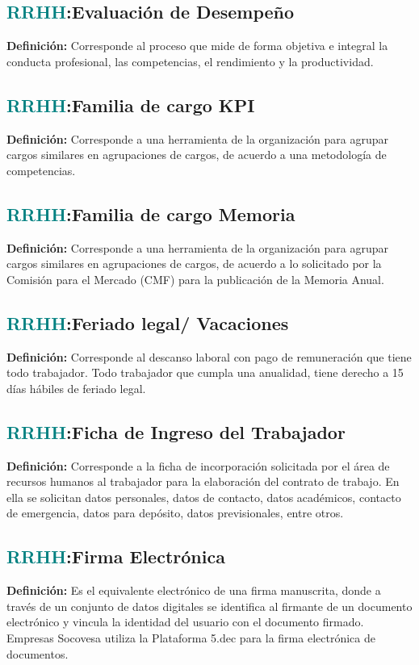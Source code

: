 \documentclass[12pt]{article}
\begin{document}
\subsection{\textcolor{teal}{RRHH}:{Evaluación de Desempeño}}
\textbf{Definición:} Corresponde al proceso que mide de forma objetiva e integral la conducta profesional, las competencias, el rendimiento y la productividad. 
\subsection{\textcolor{teal}{RRHH}:{Familia de cargo KPI}}
\textbf{Definición:} Corresponde a una herramienta de la organización para agrupar cargos similares en agrupaciones de cargos, de acuerdo a una metodología de competencias.
\subsection{\textcolor{teal}{RRHH}:{Familia de cargo Memoria}}
\textbf{Definición:} Corresponde a una herramienta de la organización para agrupar cargos similares en agrupaciones de cargos, de acuerdo a lo solicitado por la Comisión para el Mercado (CMF) para la publicación de la Memoria Anual. 
\subsection{\textcolor{teal}{RRHH}:{Feriado legal/ Vacaciones}}
\textbf{Definición:} Corresponde al descanso laboral con pago de remuneración que tiene todo trabajador. Todo trabajador que cumpla una anualidad, tiene derecho a 15 días hábiles de feriado legal.
\subsection{\textcolor{teal}{RRHH}:{Ficha de Ingreso del Trabajador}}
\textbf{Definición:} Corresponde a la ficha de incorporación solicitada por el área de recursos humanos al trabajador para la elaboración del contrato de trabajo. En ella se solicitan datos personales, datos de contacto, datos académicos, contacto de emergencia, datos para depósito, datos previsionales, entre otros.
\subsection{\textcolor{teal}{RRHH}:{Firma Electrónica}}
\textbf{Definición:} Es el equivalente electrónico de una firma manuscrita, donde a través de un conjunto de datos digitales se identifica al firmante de un documento electrónico y vincula la identidad del usuario con el documento firmado. Empresas Socovesa utiliza la Plataforma 5.dec para la firma electrónica de documentos.
\end{document}
